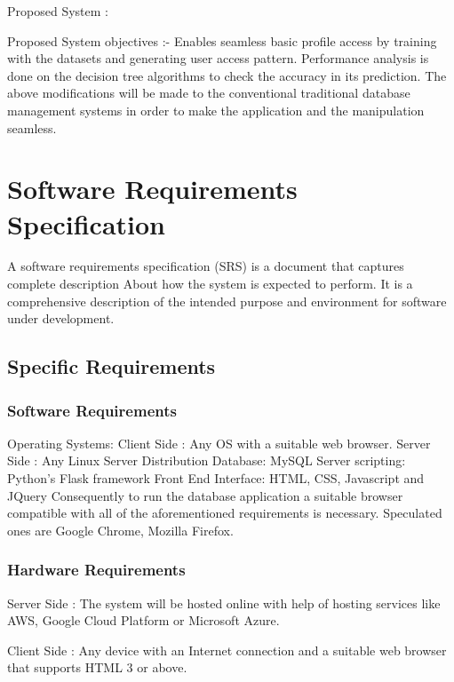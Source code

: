 \documentclass[12pt]{report}
\begin{document}
Proposed System : 

Proposed System objectives :-
Enables seamless  basic profile access by training with the datasets and generating user access pattern.
Performance analysis is done on the decision tree algorithms to check the accuracy in its prediction.
The above modifications will be made to the conventional traditional database management systems in order to make the application and the manipulation seamless.

\chapter{Software Requirements Specification}\label{ch:srr}
A software requirements specification (SRS) is a document that captures complete description      
About how the system is expected to perform. It is a comprehensive description of the intended purpose and environment for software under development.

\section{Specific Requirements} 

\subsection{Software Requirements}
Operating Systems: 
Client Side : Any OS with a suitable web browser. 
Server Side : Any Linux Server Distribution
Database: MySQL 
 Server scripting: Python’s Flask framework
Front End Interface: HTML, CSS, Javascript and JQuery
Consequently to run the database application a suitable browser compatible with all of the aforementioned requirements is necessary. Speculated ones are Google Chrome, Mozilla Firefox.

\subsection{Hardware Requirements}
Server Side : The system will be hosted online with help of hosting services like AWS, Google Cloud Platform or Microsoft Azure. 

Client Side :  Any device with an Internet connection and a suitable web browser that supports HTML 3 or above. 
\end{document}
